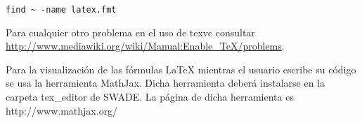 \begin{verbatim}
find ~ -name latex.fmt
\end{verbatim}

Para cualquier otro problema en el uso de texvc consultar \url{http://www.mediawiki.org/wiki/Manual:Enable_TeX/problems}.

 
Para la visualización de las fórmulas LaTeX mientras el usuario escribe su código se usa la herramienta MathJax. Dicha herramienta deberá instalarse en la carpeta tex\_editor de SWADE. La página de dicha herramienta es http://www.mathjax.org/

